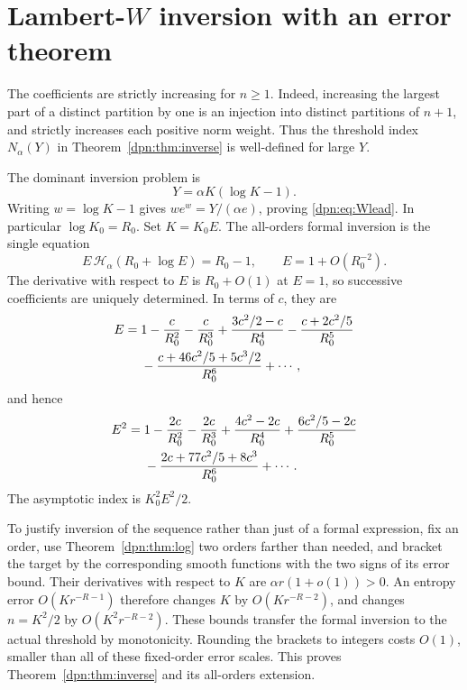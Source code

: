 \documentclass[11pt]{article}
\numberwithin{equation}{section}
\theoremstyle{definition}\newtheorem{definition}[theorem]{Definition}
\theoremstyle{remark}\newtheorem{remark}[theorem]{Remark}
\newcommand{\asym}{\mathscr H_{\alpha}}
\begin{document}
\section{\texorpdfstring{Lambert-$W$}{Lambert-W} inversion with an error theorem}\label{dpn:sec:inverse}
The coefficients are strictly increasing for $n\ge1$. Indeed, increasing the
largest part of a distinct partition by one is an injection into distinct
partitions of $n+1$, and strictly increases each positive norm weight.
Thus the threshold index $N_\alpha(Y)$ in Theorem~\ref{dpn:thm:inverse} is
well-defined for large $Y$.

The dominant inversion problem is
\[
 Y=\alpha K(\log K-1).
\]
Writing $w=\log K-1$ gives $we^w=Y/(\alpha e)$, proving
\eqref{dpn:eq:Wlead}. In particular $\log K_0=R_0$.
Set $K=K_0E$. The all-orders formal inversion is the single equation
\begin{equation}\label{dpn:eq:Einverse}
 E\,\asym(R_0+\log E)=R_0-1,
 \qquad E=1+O(R_0^{-2}).
\end{equation}
The derivative with respect to $E$ is $R_0+O(1)$ at $E=1$, so successive
coefficients are uniquely determined. In terms of $c$, they are
\begin{align}\label{dpn:eq:inverseE}
 E={}&1-\frac c{R_0^2}-\frac c{R_0^3}
       +\frac{3c^2/2-c}{R_0^4}
       -\frac{c+2c^2/5}{R_0^5}\notag\\
 &-\frac{c+46c^2/5+5c^3/2}{R_0^6}+\cdots,
\end{align}
and hence
\begin{align}\label{dpn:eq:inverseE2}
 E^2={}&1-\frac{2c}{R_0^2}-\frac{2c}{R_0^3}
       +\frac{4c^2-2c}{R_0^4}
       +\frac{6c^2/5-2c}{R_0^5}\notag\\
 &-\frac{2c+77c^2/5+8c^3}{R_0^6}+\cdots.
\end{align}
The asymptotic index is $K_0^2E^2/2$.

To justify inversion of the sequence rather than just of a formal expression,
fix an order, use Theorem~\ref{dpn:thm:log} two orders farther than needed, and
bracket the target by the corresponding smooth functions with the two signs
of its error bound. Their derivatives with respect to $K$ are
$\alpha r(1+o(1))>0$. An entropy error $O(Kr^{-R-1})$ therefore changes $K$
by $O(Kr^{-R-2})$, and changes $n=K^2/2$ by
$O(K^2r^{-R-2})$. These bounds transfer the formal inversion to the actual
threshold by monotonicity. Rounding the brackets to integers costs $O(1)$,
smaller than all of these fixed-order error scales. This proves
Theorem~\ref{dpn:thm:inverse} and its all-orders extension.
\end{document}
